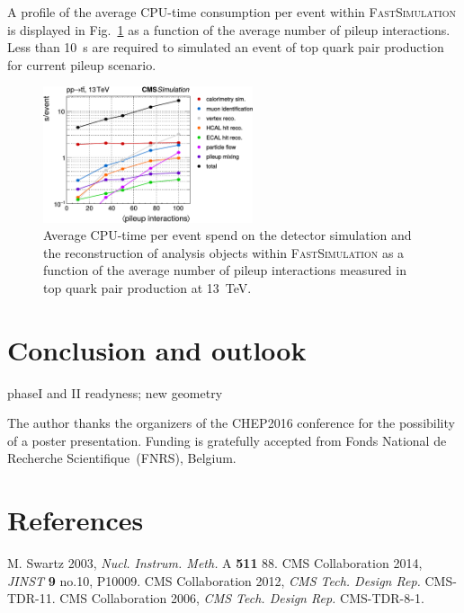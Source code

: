 \documentclass[a4paper]{jpconf}
\begin{document}
A profile of the average CPU-time consumption per event within \textsc{FastSimulation} is displayed in Fig.~\ref{fig:cpu} as a function of the average number of pileup interactions. Less than 10~s are required to simulated an event of top quark pair production for current pileup scenario.



\begin{figure}[htbp]
\begin{center}
\includegraphics[width=0.55\textwidth]{figures/cpu_profile.pdf}
\caption{\label{fig:cpu}Average CPU-time per event spend on the detector simulation and the reconstruction of analysis objects within \textsc{FastSimulation} as a function of the average number of pileup interactions measured in top quark pair production at 13~TeV.}
\end{center}
\end{figure}

\section{Conclusion and outlook}

phaseI and II readyness; new geometry

\ack
The author thanks the organizers of the \textsc{CHEP2016} conference for the possibility of a poster presentation. Funding is gratefully accepted from Fonds National de Recherche Scientifique~(FNRS), Belgium.


\section{References}
\begin{thebibliography}{99}
 M. Swartz 2003, {\it Nucl. Instrum. Meth.} A \textbf{511} 88.
 CMS Collaboration 2014, {\it JINST} \textbf{9} no.10, P10009.
 CMS Collaboration 2012, {\it CMS Tech. Design Rep.} CMS-TDR-11.
 CMS Collaboration 2006, {\it CMS Tech. Design Rep.} CMS-TDR-8-1.

\end{thebibliography}
\end{document}
